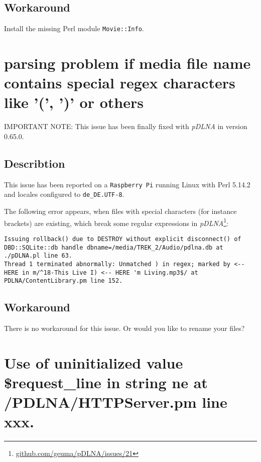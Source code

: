 \subsection{Workaround}

Install the missing Perl module \verb|Movie::Info|.

\section{parsing problem if media file name contains special regex characters like '(', ')' or others}

\begin{colframeimportantnote}
\textsc{IMPORTANT NOTE:} This issue has been finally fixed with {\em pDLNA} in version 0.65.0.
\end{colframeimportantnote}

\subsection{Describtion}

This issue has been reported on a \verb|Raspberry Pi| running Linux with Perl 5.14.2 and locales configured to \verb|de_DE.UTF-8|.

The following error appears, when files with special characters (for instance brackets) are existing, which break some regular expressions in {\em pDLNA}\footnote{\url{github.com/geuma/pDLNA/issues/21}}:
\begin{lstlisting}
Issuing rollback() due to DESTROY without explicit disconnect() of DBD::SQLite::db handle dbname=/media/TREK_2/Audio/pdlna.db at ./pDLNA.pl line 63.
Thread 1 terminated abnormally: Unmatched ) in regex; marked by <-- HERE in m/^18-This Live I) <-- HERE 'm Living.mp3$/ at PDLNA/ContentLibrary.pm line 152.
\end{lstlisting}

\subsection{Workaround}

There is no workaround for this issue. Or would you like to rename your files?

\section{Use of uninitialized value \$request\_line in string ne at /PDLNA/HTTPServer.pm line xxx.}

